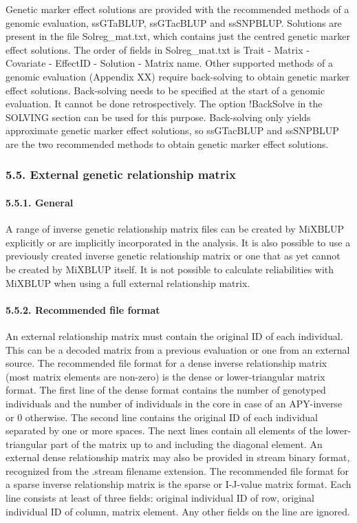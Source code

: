 Genetic marker effect solutions are provided with the recommended
methods of a genomic evaluation, ssGTaBLUP, ssGTacBLUP and ssSNPBLUP.
Solutions are present in the file Solreg\_mat.txt, which contains just
the centred genetic marker effect solutions. The order of fields in
Solreg\_mat.txt is Trait - Matrix - Covariate - EffectID - Solution -
Matrix name. Other supported methods of a genomic evaluation (Appendix
XX) require back-solving to obtain genetic marker effect solutions.
Back-solving needs to be specified at the start of a genomic evaluation.
It cannot be done retrospectively. The option !BackSolve in the SOLVING
section can be used for this purpose. Back-solving only yields
approximate genetic marker effect solutions, so ssGTacBLUP and ssSNPBLUP
are the two recommended methods to obtain genetic marker effect
solutions.

\subsubsection{5.5. External genetic relationship matrix}\label{Gene54}

\paragraph{5.5.1. General}\label{Gene55}

A range of inverse genetic relationship matrix files can be created by
MiXBLUP explicitly or are implicitly incorporated in the analysis. It is
also possible to use a previously created inverse genetic relationship
matrix or one that as yet cannot be created by MiXBLUP itself. It is not
possible to calculate reliabilities with MiXBLUP when using a full
external relationship matrix.

\paragraph{5.5.2. Recommended file format}\label{Gene56}

An external relationship matrix must contain the original ID of each
individual. This can be a decoded matrix from a previous evaluation or
one from an external source. The recommended file format for a dense
inverse relationship matrix (most matrix elements are non-zero) is the
dense or lower-triangular matrix format. The first line of the dense
format contains the number of genotyped individuals and the number of
individuals in the core in case of an APY-inverse or 0 otherwise. The
second line contains the original ID of each individual separated by one
or more spaces. The next lines contain all elements of the
lower-triangular part of the matrix up to and including the diagonal
element. An external dense relationship matrix may also be provided in
stream binary format, recognized from the .stream filename extension.
The recommended file format for a sparse inverse relationship matrix is
the sparse or I-J-value matrix format. Each line consists at least of
three fields: original individual ID of row, original individual ID of
column, matrix element. Any other fields on the line are ignored.

